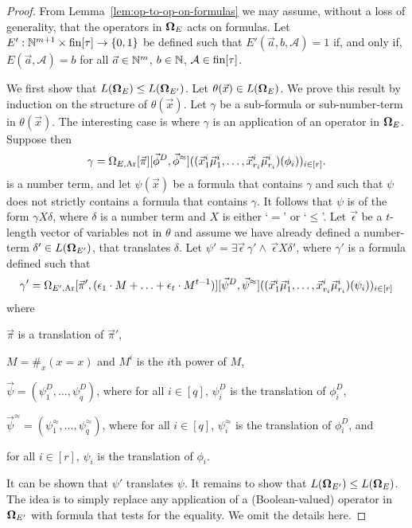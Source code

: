 \documentclass[../main/thesis.tex]{subfiles}
\begin{document}
\begin{proof}
  From Lemma~\ref{lem:op-to-op-on-formulas} we may assume, without a loss of
  generality, that the operators in $\mathbf{\mathbf{\Omega}}_E$ acts on formulas. Let $E' :
  \mathbb{N}^{m + 1} \times \text{\upshape fin}[\tau] \rightarrow \{0,1\}$ be defined such that $E'(\vec{a},
  b, \mathcal{A}) = 1$ if, and only if, $E(\vec{a}, \mathcal{A}) = b$ for all
  $\vec{a} \in \mathbb{N}^m$, $b \in \mathbb{N}$, $\mathcal{A} \in \text{\upshape fin}[\tau]$.

  We first show that $L(\mathbf{\mathbf{\Omega}}_E) \leq L(\mathbf{\mathbf{\Omega}}_{E'})$. Let $\theta(\vec{x}) \in
  L(\mathbf{\mathbf{\Omega}}_E)$. We prove this result by induction on the structure of
  $\theta(\vec{x})$. Let $\gamma$ be a sub-formula or sub-number-term in
  $\theta(\vec{x})$. The interesting case is where $\gamma$ is an application of
  an operator in $\mathbf{\mathbf{\Omega}}_E$. Suppose then
  \begin{align*}
    \gamma = \Omega_{E, \text{\upshape Ar}}[\vec{\pi}][\vec{\phi}^D, \vec{\phi}^{\approx}] ((\vec{x}^i_1 \vec{\mu}^i_1, \ldots, \vec{x}^i_{r_i} \vec{\mu}^i_{r_i})(\phi_i))_{i \in [r]}.
  \end{align*}
  is a number term, and let $\psi(\vec{x})$ be a formula that contains $\gamma$
  and such that $\psi$ does not strictly contains a formula that contains
  $\gamma$. It follows that $\psi$ is of the form $\gamma X \delta$, where
  $\delta$ is a number term and $X$ is either `$=$' or `$\leq$'. Let
  $\vec{\epsilon}$ be a $t$-length vector of variables not in $\theta$ and
  assume we have already defined a number-term $\delta' \in L(\mathbf{\mathbf{\Omega}}_{E'})$,
  that translates $\delta$. Let $\psi' = \exists \vec{\epsilon} \, \gamma' \land
  \, \vec{\epsilon} X \delta'$, where $\gamma'$ is a formula defined such that
  \begin{align*}
    \gamma' = \Omega_{E', \text{\upshape Ar}}[\vec{\pi}', (\epsilon_1 \cdot M + \ldots + \epsilon_t \cdot M^{t-1})][\vec{\psi}^D, \vec{\psi}^{\approx}] ((\vec{x}^i_1 \vec{\mu}^i_1, \ldots, \vec{x}^i_{r_i} \vec{\mu}^i_{r_i})(\psi_i))_{i \in [r]}
  \end{align*}
  where
  \begin{myitemize}
  \item $\vec{\pi}$ is a translation of $\vec{\pi}'$,
  \item $M = \#_x (x = x)$ and $M^{i}$ is the $i$th power of $M$,
  \item $\vec{\psi} = (\psi^D_1, \ldots, \psi^D_{q})$, where for all $i \in
    [q]$, $\psi^D_i$ is the translation of $\phi^D_i$,
  \item $\vec{\psi}^{\approx} = (\psi^{\approx}_1, \ldots, \psi^{\approx}_q)$,
    where for all $i \in [q]$, $\psi^{\approx}_i$ is the translation of
    $\phi^D_i$, and
  \item for all $i \in [r]$, $\psi_i$ is the translation of $\phi_i$.
  \end{myitemize}
  It can be shown that $\psi'$ translates $\psi$. It remains to show that
  $L(\mathbf{\mathbf{\Omega}}_{E'}) \leq L(\mathbf{\mathbf{\Omega}}_{E})$. The idea is to simply replace any
  application of a (Boolean-valued) operator in $\mathbf{\mathbf{\Omega}}_{E'}$ with formula that
  tests for the equality. We omit the details here.
\end{proof}
\end{document}
